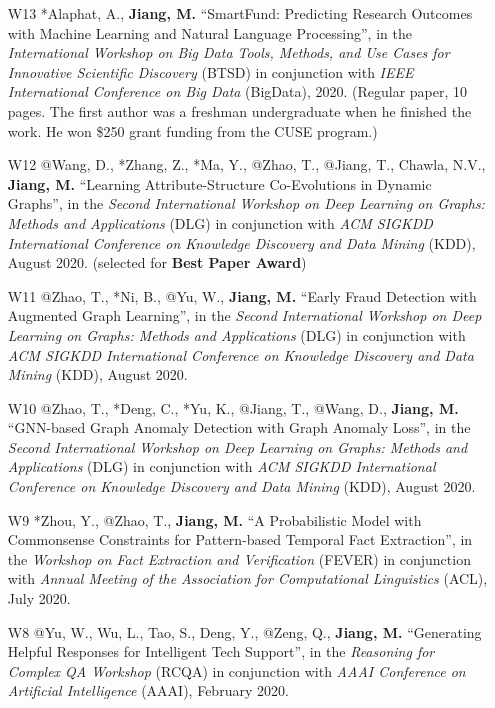 \documentclass[10pt]{article}
\newenvironment{myindentpar}[1]%
{\begin{list}{}%
         {\setlength{\leftmargin}{#1}}%
         \item[]%
}
{\end{list}}
\newcounter{list}
\begin{document}
\begin{myindentpar}{0.00cm}
\begin{enumerate}[leftmargin=.5cm]
\item[W13] *Alaphat, A., \textbf{Jiang, M.} ``SmartFund: Predicting Research Outcomes with Machine Learning and Natural Language Processing'', in the \textit{International Workshop on Big Data Tools, Methods, and Use Cases for Innovative Scientific Discovery} (BTSD) in conjunction with \textit{IEEE International Conference on Big Data} (BigData), 2020. (Regular paper, 10 pages. The first author was a freshman undergraduate when he finished the work. He won \$250 grant funding from the CUSE program.)

\item[W12] @Wang, D., *Zhang, Z., *Ma, Y., @Zhao, T., @Jiang, T., Chawla, N.V., \textbf{Jiang, M.} ``Learning Attribute-Structure Co-Evolutions in Dynamic Graphs'', in the \textit{Second International Workshop on Deep Learning on Graphs: Methods and Applications} (DLG) in conjunction with \textit{ACM SIGKDD International Conference on Knowledge Discovery and Data Mining} (KDD), August 2020. (selected for \textbf{Best Paper Award})

\item[W11] @Zhao, T., *Ni, B., @Yu, W., \textbf{Jiang, M.} ``Early Fraud Detection with Augmented Graph Learning'', in the \textit{Second International Workshop on Deep Learning on Graphs: Methods and Applications} (DLG) in conjunction with \textit{ACM SIGKDD International Conference on Knowledge Discovery and Data Mining} (KDD), August 2020.

\item[W10] @Zhao, T., *Deng, C., *Yu, K., @Jiang, T., @Wang, D., \textbf{Jiang, M.} ``GNN-based Graph Anomaly Detection with Graph Anomaly Loss'', in the \textit{Second International Workshop on Deep Learning on Graphs: Methods and Applications} (DLG) in conjunction with \textit{ACM SIGKDD International Conference on Knowledge Discovery and Data Mining} (KDD), August 2020.

\item[W9] *Zhou, Y., @Zhao, T., \textbf{Jiang, M.} ``A Probabilistic Model with Commonsense Constraints for Pattern-based Temporal Fact Extraction'', in the \textit{Workshop on Fact Extraction and Verification} (FEVER) in conjunction with \textit{Annual Meeting of the Association for Computational Linguistics} (ACL), July 2020.

\item[W8] @Yu, W., Wu, L., Tao, S., Deng, Y., @Zeng, Q., \textbf{Jiang, M.} ``Generating Helpful Responses for Intelligent Tech Support'', in the \textit{Reasoning for Complex QA  Workshop} (RCQA) in conjunction with \textit{AAAI Conference on Artificial Intelligence} (AAAI), February 2020.


\end{enumerate}
\end{myindentpar}
\end{document}
